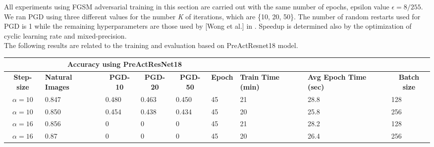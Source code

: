 \documentclass{article}
\begin{document}
All experiments using FGSM adversarial training in this section are carried out
with the same number of epochs, epsilon value $\epsilon = 8/255$. We ran PGD using three different values for the number \textit{K} of iterations,
which are \{10, 20, 50\}. The number of random restarts used for PGD is 1
while the remaining hyperparameters are those used by [Wong et al.]
in \cite{WongEtAl2020}. Speedup is determined also by the optimization of cyclic learning rate and
mixed-precision.\\
The following results are related to the training and evaluation based on PreActResnet18 model. 
\begin{center}
\begin{table}[hbt!]
\begin{tabular}{|c|l|l|l|l|l|l|l|l|}
\hline
\multicolumn{1}{|l|}{{ }} & \multicolumn{4}{c|}{{ \textbf{Accuracy using
PreActResNet18}}}
& \multicolumn{4}{l|}{{ }}
\\ \hline
{ \textbf{Step-size}}     & \multicolumn{1}{p{1.5cm}|}{{ \textbf{Natural
Images}}} & \multicolumn{1}{c|}{{ \textbf{PGD-10}}} & \multicolumn{1}{c|}{{
\textbf{PGD-20}}} & \multicolumn{1}{c|}{{ \textbf{PGD-50}}} &
\multicolumn{1}{c|}{{ \textbf{Epoch}}} & \multicolumn{1}{p{1.5cm}|}{{
\textbf{Train Time (min)}}} & \multicolumn{1}{p{1.5cm}|}{{ \textbf{Avg Epoch
Time (sec)}}} & \multicolumn{1}{c|}{{ \textbf{Batch size}}} \\ \hline
{ $\alpha = 10$}       & { 0.847}                                        & {
0.480}                                & { 0.463}
& { 0.450}                                & { 45}
& { 21 }                               & { 28.8 }
& { 128}                                      \\ \hline
{ $\alpha = 10$}       & { 0.850}                                        & {
0.454}                                & { 0.438}
& { 0.434}                                & { 45}
& { 20 }                               & { 25.8 }
& { 256}                                      \\ \hline
{ $\alpha = 16$}       & { 0.856}                                        & { 0}
& { 0}                                    & { 0}
& { 45}                                  & { 21 }
& { 28.2 }                                 & { 128}
\\ \hline
{ $\alpha = 16$}       & { 0.87}                                         & { 0}
& { 0}                                    & { 0}
& { 45}                                  & { 20 }
& { 26.4 }                                 & { 256}
\\ \hline
\end{tabular}
\end{table}
\end{center}
\end{document}
